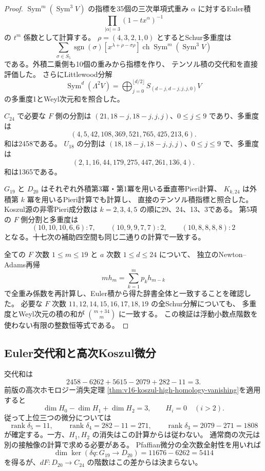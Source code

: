 \documentclass[a4paper,11pt]{ltjsarticle}
\theoremstyle{definition}
\begin{document}
\begin{proof}
$\operatorname{Sym}^m(\operatorname{Sym}^3V)$ の指標を35個の三次単項式重み
$\alpha$ に対するEuler積
\[
 \prod_{|\alpha|=3}(1-tx^\alpha)^{-1}
\]
の $t^m$ 係数として計算する。
$\rho=(4,3,2,1,0)$ とするとSchur多重度は
\[
 \sum_{\sigma\in S_5}\operatorname{sgn}(\sigma)
 [x^{\lambda+\rho-\sigma\rho}]
 \operatorname{ch}\operatorname{Sym}^m(\operatorname{Sym}^3V)
\]
である。外積二乗側も10個の重みから指標を作り、
テンソル積の交代和を直接評価した。
さらにLittlewood分解
\[
 \operatorname{Sym}^{d}(\Lambda^2V)
 =\bigoplus_{j=0}^{\lfloor d/2\rfloor}S_{(d-j,d-j,j,j,0)}V
\]
の多重度1とWeyl次元和を照合した。

$C_{24}$ で必要な $F$ 側の分割は
$(21,18-j,18-j,j,j)$、$0\leq j\leq9$ であり、多重度は
\[
 (4,5,42,108,369,521,765,425,213,6).
\]
和は2458である。
$U_{18}$ の分割は $(18,18-j,18-j,j,j)$、$0\leq j\leq9$ で、多重度は
\[
 (2,1,16,44,179,275,447,261,136,4).
\]
和は1365である。

$G_{19}$ と $D_{20}$ はそれぞれ外積第3冪・第1冪を用いる垂直帯Pieri計算、
$K_{k,24}$ は外積第 $k$ 冪を用いるPieri計算でも計算し、
直接のテンソル積指標と照合した。
Koszul源の非零Pieri成分数は $k=2,3,4,5$ の順に29、24、13、3である。
第5項の $F$ 側分割と多重度は
\[
 (10,10,10,6,6):7,\qquad
 (10,9,9,7,7):2,\qquad
 (10,8,8,8,8):2
\]
となる。十七次の補助四空間も同じ二通りの計算で一致する。

全ての $F$ 次数 $1\leq m\leq19$ と $a$ 次数 $1\leq d\leq24$ について、
独立のNewton--Adams再帰
\[
 m h_m=\sum_{k=1}^{m}p_kh_{m-k}
\]
で全重み係数を再計算し、Euler積から得た辞書全体と一致することを確認した。
必要な $F$ 次数 $11,12,14,15,16,17,18,19$ の全Schur分解についても、
多重度とWeyl次元の積の和が $\binom{m+34}{m}$ に一致する。
この検証は浮動小数点階数を使わない有限の整数恒等式である。
\end{proof}

\subsection{Euler交代和と高次Koszul微分}

交代和は
\[
 2458-6262+5615-2079+282-11=3.
\]
前版の高次ホモロジー消失定理
\ref{thm:v16-koszul-high-homology-vanishing}を適用すると
\[
 \dim H_0-\dim H_1+\dim H_2=3,
 \qquad H_i=0\quad(i>2).
\]
従って上位三つの微分については
\[
 \operatorname{rank}\delta_5=11,\qquad
 \operatorname{rank}\delta_4=282-11=271,\qquad
 \operatorname{rank}\delta_3=2079-271=1808
\]
が確定する。一方、$H_1,H_2$ の消失はこの計算からは従わない。
通常商の次元は別の接触像の計算で求める必要がある。
Pfaffian微分の全次数全射性を用いれば
\[
 \dim\ker(\delta q:G_{19}\longrightarrow D_{20})=11676-6262=5414
\]
を得るが、$dF:D_{20}\to C_{24}$ の階数はこの差からは決まらない。
\end{document}
